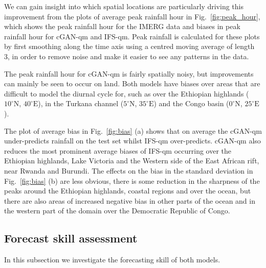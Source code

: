 \documentclass{article}
\begin{document}
We can gain insight into which spatial locations are particularly driving this improvement from the plots of average peak rainfall hour in Fig.~\ref{fig:peak_hour}, which shows the peak rainfall hour for the IMERG data and biases in peak rainfall hour for cGAN-qm and IFS-qm. 
Peak rainfall is calculated for these plots by first smoothing along the time axis using a centred moving average of length 3, in order to remove noise and make it easier to see any patterns in the data. 

The peak rainfall hour for cGAN-qm is fairly spatially noisy, but improvements can mainly be seen to occur on land. Both models have biases over areas that are difficult to model the diurnal cycle for, such as over the Ethiopian highlands ($10^{\circ}\text{N}
$, $40^{\circ}\text{E}$), in the Turkana channel ($5^{\circ}\text{N}
$, $35^{\circ}\text{E}$) and the Congo basin ($0^{\circ}\text{N}
$, $25^{\circ}\text{E}$).


The plot of average bias in Fig.~\ref{fig:bias} (a) shows that on average the cGAN-qm under-predicts rainfall on the test set whilst IFS-qm over-predicts. cGAN-qm also reduces the most prominent average biases of IFS-qm occurring over the Ethiopian highlands, Lake Victoria and the Western side of the East African rift, near Rwanda and Burundi. The effects on the bias in the standard deviation in Fig.~\ref{fig:bias} (b) are less obvious, there is some reduction in the sharpness of the peaks around the Ethiopian highlands, coastal regions and over the ocean, but there are also areas of increased negative bias in other parts of the ocean and in the western part of the domain over the Democratic Republic of Congo. 






\subsection{Forecast skill assessment}
\label{sec:fcst_skill}

In this subsection we investigate the forecasting skill of both models. 
\end{document}
